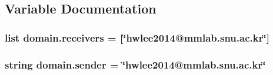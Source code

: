 \subsection{Variable Documentation}
\hypertarget{namespacedomain_a7bd9143de7ed5ad9219ee68c3fb7800e}{
\subsubsection[{receivers}]{\setlength{\rightskip}{0pt plus 5cm}list domain.\-receivers = \mbox{[}\char`\"{}hwlee2014@mmlab.\-snu.\-ac.\-kr\char`\"{}\mbox{]}}}\label{namespacedomain_a7bd9143de7ed5ad9219ee68c3fb7800e}
\hypertarget{namespacedomain_a0a669ce335d07e3693207b184ec45d0c}{
\subsubsection[{sender}]{\setlength{\rightskip}{0pt plus 5cm}string domain.\-sender = \char`\"{}hwlee2014@mmlab.\-snu.\-ac.\-kr\char`\"{}}}\label{namespacedomain_a0a669ce335d07e3693207b184ec45d0c}
